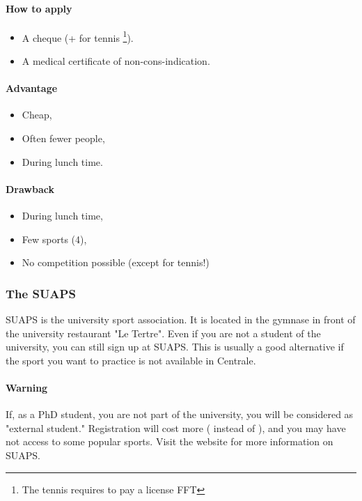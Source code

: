 \paragraph{How to apply}
\begin{itemize}
  \item A cheque  (+  for tennis \footnote {The tennis requires to pay a license FFT}).
  \item A medical certificate of non-cons-indication.
\end{itemize}

\paragraph{Advantage}
\begin{itemize}
  \item Cheap,
  \item Often fewer people,
  \item During lunch time.
\end{itemize}
\paragraph{Drawback}
\begin{itemize}
  \item During lunch time,
  \item Few sports (4),
  \item No competition possible (except for tennis!)
\end{itemize}

\subsubsection {The SUAPS}
SUAPS is the university sport association. It is located in the gymnase in front of the university restaurant "Le Tertre".
Even if you are not a student of the university, you can still sign up at SUAPS.
This is usually a good alternative if the sport you want to practice is not available in Centrale.

\paragraph{Warning} If, as a PhD student, you are not part of the university, you will be considered as "external student."
Registration will cost more ( instead of ), and you may have not access to some popular sports.
Visit the website for more information on SUAPS.

